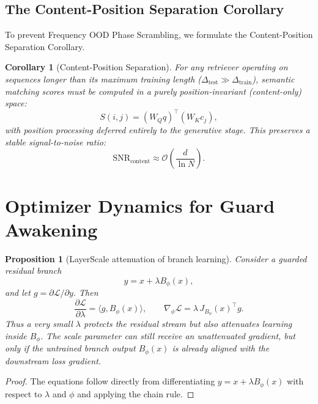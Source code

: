 \documentclass[11pt]{article}
\newtheorem{proposition}[theorem]{Proposition}
\newtheorem{corollary}[theorem]{Corollary}
\begin{document}
\subsection{The Content-Position Separation Corollary}

To prevent Frequency OOD Phase Scrambling, we formulate the Content-Position Separation Corollary.

\begin{corollary}[Content-Position Separation]
For any retriever operating on sequences longer than its maximum training length ($\Delta_{\text{test}} \gg \Delta_{\text{train}}$), semantic matching scores must be computed in a purely position-invariant (content-only) space:
\begin{equation}
S(i, j) = (W_Q q)^\top (W_K c_j),
\end{equation}
with position processing deferred entirely to the generative stage. This preserves a stable signal-to-noise ratio:
\begin{equation}
\text{SNR}_{\text{content}} \approx \mathcal{O}\left(\frac{d}{\ln N}\right).
\end{equation}
\end{corollary}

\section{Optimizer Dynamics for Guard Awakening}
\label{app:optimizer}

\begin{proposition}[LayerScale attenuation of branch learning]
\label{prop:layerscale-grad}
Consider a guarded residual branch
\begin{equation}
y=x+\lambda B_\phi(x),
\end{equation}
and let $g=\partial\mathcal{L}/\partial y$. Then
\begin{equation}
\frac{\partial\mathcal{L}}{\partial\lambda}=\langle g,B_\phi(x)\rangle,
\qquad
\nabla_\phi\mathcal{L}=\lambda\,J_{B_\phi}(x)^\top g.
\end{equation}
Thus a very small $\lambda$ protects the residual stream but also attenuates learning inside $B_\phi$. The scale parameter can still receive an unattenuated gradient, but only if the untrained branch output $B_\phi(x)$ is already aligned with the downstream loss gradient.
\end{proposition}

\begin{proof}
The equations follow directly from differentiating $y=x+\lambda B_\phi(x)$ with respect to $\lambda$ and $\phi$ and applying the chain rule.
\end{proof}
\end{document}
